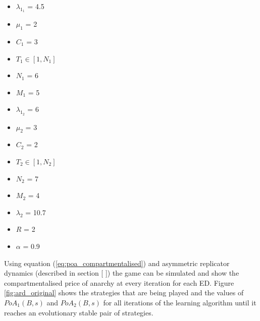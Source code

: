 \begin{multicols}{3}
    \begin{itemize}        
        \item \( \lambda_{1_1} \) = 4.5
        \item \( \mu_1 \) = 2
        \item \( C_1 \) = 3
        \item \( T_1 \in [1, N_1] \) 
        \item \( N_1 \) = 6
        \item \( M_1 \) = 5

        \columnbreak
        \item \( \lambda_{1_2} \) = 6
        \item \( \mu_2 \) = 3
        \item \( C_2 \) = 2
        \item \( T_2 \in [1, N_2] \)
        \item \( N_2 \) = 7
        \item \( M_2 \) = 4
        
        \columnbreak
        \item \( \lambda_2 \) = 10.7
        \item \( R \) = 2
        \item \( \alpha \) = 0.9
    \end{itemize}
\end{multicols}

Using equation (\ref{eq:poa_compartmentalised}) and asymmetric replicator 
dynamics (described in section [ ])
the game can be simulated and show the compartmentalised price of 
anarchy at every iteration for each ED.
Figure \ref{fig:ard_original} shows the strategies that are being played and 
the values of \(PoA_1(B, s)\) and \(PoA_2(B, s)\) for all iterations of the 
learning algorithm until it reaches an evolutionary stable pair of strategies.

